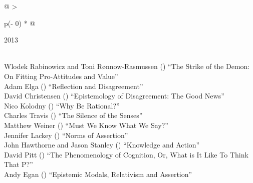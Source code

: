 \documentclass[
  10pt,
  letterpaper,
  DIV=11,
  numbers=noendperiod,
  twoside]{scrartcl}
\begin{document}
\begin{longtable}[]{@{}
  >{\raggedright\arraybackslash}p{(\columnwidth - 0\tabcolsep) * }@{}}

\caption{\label{tbl-top-ten-2004}Most cited articles published less than
ten years ago as of 2013.}

\tabularnewline

\toprule\noalign{}
\begin{minipage}[b]{\linewidth}\raggedright
2013
\end{minipage} \\
\midrule\noalign{}
\endhead
\bottomrule\noalign{}
\endlastfoot
Wlodek Rabinowicz and Toni Rønnow‐Rasmussen
()
``The Strike of the Demon: On Fitting Pro-Attitudes and Value'' \\
Adam Elga
()
``Reflection and Disagreement'' \\
David Christensen
()
``Epistemology of Disagreement: The Good News'' \\
Nico Kolodny
()
``Why Be Rational?'' \\
Charles Travis
()
``The Silence of the Senses'' \\
Matthew Weiner
()
``Must We Know What We Say?'' \\
Jennifer Lackey
()
``Norms of Assertion'' \\
John Hawthorne and Jason Stanley
()
``Knowledge and Action'' \\
David Pitt
()
``The Phenomenology of Cognition, Or, What is It Like To Think That
P?'' \\
Andy Egan
()
``Epistemic Modals, Relativism and Assertion'' \\

\end{longtable}
\end{document}
